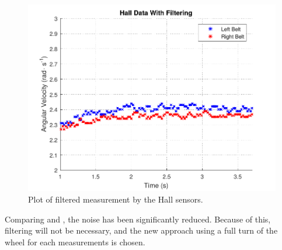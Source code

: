 \begin{figure}[H]
	\centering
	\includegraphics[scale=0.9]{figures/filteredHall.pdf}
	\caption{Plot of filtered measurement by the Hall sensors.}
	\label{filteredHall}
\end{figure}\vspace{-5mm}

Comparing  and , the noise has been significantly reduced.
Because of this, filtering will not be necessary, and the new approach using a full turn of the wheel for each measurements is chosen.


